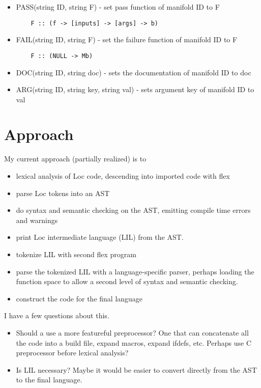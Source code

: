 \documentclass[12pt]{article}
\begin{document}
\begin{itemize}
  \item PASS(string ID, string F) - set pass function of manifold ID to F

\begin{verbatim}
    F :: (f -> [inputs] -> [args] -> b)
\end{verbatim}

  \item FAIL(string ID, string F) - set the failure function of manifold ID to F

\begin{verbatim}
    F :: (NULL -> Mb)
\end{verbatim}

  \item DOC(string ID, string doc) - sets the documentation of manifold ID to doc

  \item ARG(string ID, string key, string val) - sets argument key of manifold ID to val

\end{itemize}

\section{Approach}

My current approach (partially realized) is to

\begin{itemize}
 \item lexical analysis of Loc code, descending into imported code with flex
 \item parse Loc tokens into an AST
 \item do syntax and semantic checking on the AST, emitting compile time errors
    and warnings 
 \item print Loc intermediate language (LIL) from the AST.
 \item tokenize LIL with second flex program
 \item parse the tokenized LIL with a language-specific parser, perhaps loading
    the function space to allow a second level of syntax and semantic checking.
 \item construct the code for the final language
\end{itemize}

I have a few questions about this.

\begin{itemize}
 \item Should a use a more featureful preprocessor? One that can concatenate all
    the code into a build file, expand macros, expand ifdefs, etc. Perhaps use
    C preprocessor before lexical analysis?

 \item Is LIL necessary? Maybe it would be easier to convert directly from the AST
    to the final language.
\end{itemize}
\end{document}
